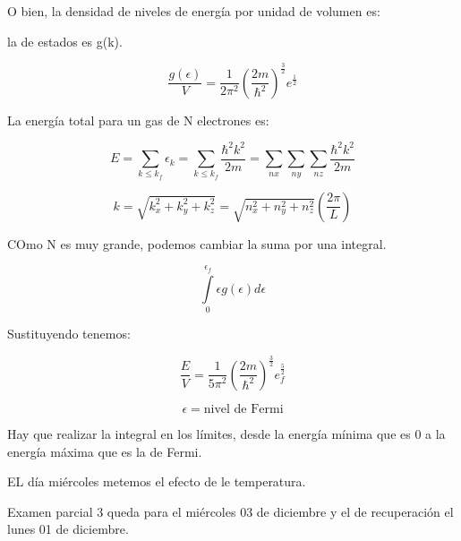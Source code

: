 \documentclass{article}
\begin{document}
O bien, la densidad de niveles de energía por unidad de volumen es: 


la de estados es g(k).



\[ \frac{g(\epsilon)}{V} = \frac{1}{2\pi^{2}} \left( \frac{2m}{\hbar^{2}} \right)^{\frac{3}{2}} e^{\frac{1}{2}}  \]


La energía total para un gas de N electrones es: 


\[   E = \sum\limits_{k \leq k_{f} } \epsilon_{k} = \sum\limits_{ k \leq k_{f} } \frac{ \hbar^{2} k^{2}   }{2m}  = \sum\limits_{nx}\sum\limits_{ny}\sum\limits_{nz} \frac{ \hbar^{2}k^{2}  }{2m}     \]


\[ k = \sqrt{ k_{x}^{2} + k_{y}^{2} + k_{z}^{2}  }  = \sqrt{ n_{x}^{2} + n_{y}^{2} + n_{z}^{2}    }  \left( \frac{2\pi}{L}  \right)  \]




COmo N es muy grande, podemos cambiar la suma por una integral.


\[  \int\limits_{0}^{\epsilon_{f}} \epsilon g(\epsilon) d\epsilon \]



Sustituyendo tenemos:



\[\frac{ E  }{V} = \frac{1}{5\pi^{2}} \left(  \frac{2m}{\hbar^{2}}   \right)^{\frac{3}{2}} e^{\frac{5}{2}}_{f}  \]


\[ \epsilon = \text{nivel de Fermi} \]

Hay que realizar la integral en los límites, desde la energía mínima que es 0 a la energía máxima que es la de Fermi.



EL día miércoles metemos el efecto de le temperatura. 

Examen parcial 3 queda para el miércoles 03 de diciembre y el de recuperación el lunes 01 de diciembre. 
\end{document}

